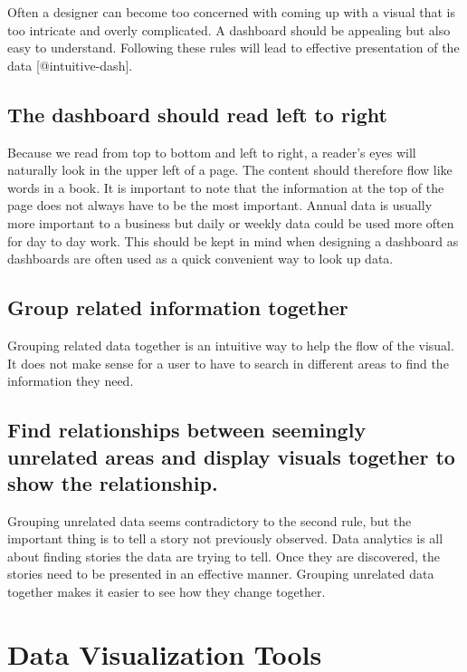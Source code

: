 \documentclass[]{book}
\theoremstyle{definition}
\theoremstyle{definition}
\theoremstyle{definition}
\theoremstyle{remark}
\begin{document}
Often a designer can become too concerned with coming up with a visual
that is too intricate and overly complicated. A dashboard should be
appealing but also easy to understand. Following these rules will lead
to effective presentation of the data {[}@intuitive-dash{]}.

\subsection{The dashboard should read left to
right}\label{the-dashboard-should-read-left-to-right}

Because we read from top to bottom and left to right, a reader's eyes
will naturally look in the upper left of a page. The content should
therefore flow like words in a book. It is important to note that the
information at the top of the page does not always have to be the most
important. Annual data is usually more important to a business but daily
or weekly data could be used more often for day to day work. This should
be kept in mind when designing a dashboard as dashboards are often used
as a quick convenient way to look up data.

\subsection{Group related information
together}\label{group-related-information-together}

Grouping related data together is an intuitive way to help the flow of
the visual. It does not make sense for a user to have to search in
different areas to find the information they need.

\subsection{Find relationships between seemingly unrelated areas and
display visuals together to show the
relationship.}\label{find-relationships-between-seemingly-unrelated-areas-and-display-visuals-together-to-show-the-relationship.}

Grouping unrelated data seems contradictory to the second rule, but the
important thing is to tell a story not previously observed. Data
analytics is all about finding stories the data are trying to tell. Once
they are discovered, the stories need to be presented in an effective
manner. Grouping unrelated data together makes it easier to see how they
change together.

\section{Data Visualization Tools}\label{data-visualization-tools}
\end{document}
